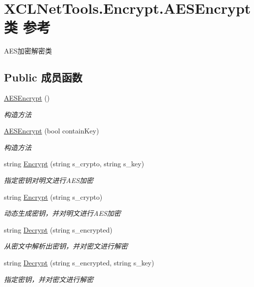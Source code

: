 \hypertarget{class_x_c_l_net_tools_1_1_encrypt_1_1_a_e_s_encrypt}{}\section{X\+C\+L\+Net\+Tools.\+Encrypt.\+A\+E\+S\+Encrypt类 参考}
\label{class_x_c_l_net_tools_1_1_encrypt_1_1_a_e_s_encrypt}


A\+E\+S加密解密类  


\subsection*{Public 成员函数}
\begin{DoxyCompactItemize}
\item 
\hyperlink{class_x_c_l_net_tools_1_1_encrypt_1_1_a_e_s_encrypt_a5fb828cbf3cf36b59138650043c2a559}{A\+E\+S\+Encrypt} ()
\begin{DoxyCompactList}\small\item\em 构造方法 \end{DoxyCompactList}\item 
\hyperlink{class_x_c_l_net_tools_1_1_encrypt_1_1_a_e_s_encrypt_a1c8a3b1284f7846bae3a273cc1ccc055}{A\+E\+S\+Encrypt} (bool contain\+Key)
\begin{DoxyCompactList}\small\item\em 构造方法 \end{DoxyCompactList}\item 
string \hyperlink{class_x_c_l_net_tools_1_1_encrypt_1_1_a_e_s_encrypt_af5664c832b91bec53e4f5ede0ac04afb}{Encrypt} (string s\+\_\+crypto, string s\+\_\+key)
\begin{DoxyCompactList}\small\item\em 指定密钥对明文进行\+A\+E\+S加密 \end{DoxyCompactList}\item 
string \hyperlink{class_x_c_l_net_tools_1_1_encrypt_1_1_a_e_s_encrypt_a7c3fb0d592414659abd08468847c374f}{Encrypt} (string s\+\_\+crypto)
\begin{DoxyCompactList}\small\item\em 动态生成密钥，并对明文进行\+A\+E\+S加密 \end{DoxyCompactList}\item 
string \hyperlink{class_x_c_l_net_tools_1_1_encrypt_1_1_a_e_s_encrypt_ac8c024479b061e0d7d1a83308a2cbe99}{Decrypt} (string s\+\_\+encrypted)
\begin{DoxyCompactList}\small\item\em 从密文中解析出密钥，并对密文进行解密 \end{DoxyCompactList}\item 
string \hyperlink{class_x_c_l_net_tools_1_1_encrypt_1_1_a_e_s_encrypt_ab7e79827a218ac4ac89893b1fde2df4c}{Decrypt} (string s\+\_\+encrypted, string s\+\_\+key)
\begin{DoxyCompactList}\small\item\em 指定密钥，并对密文进行解密 \end{DoxyCompactList}\end{DoxyCompactItemize}
